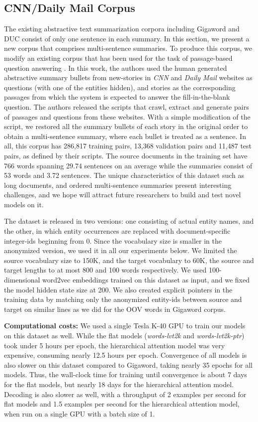 \subsection{CNN/Daily Mail Corpus} The existing abstractive text summarization corpora including Gigaword and DUC consist of only one sentence in each summary. In this section, we present a new corpus that comprises multi-sentence summaries. To produce this corpus, we modify an existing corpus that has been used for the task of passage-based question answering \cite{reading_comprehension}. In this work, the authors used the human generated abstractive summary bullets from new-stories in {\it CNN} and {\it Daily Mail} websites as questions (with one of the entities hidden), and stories as the corresponding passages from which the system is expected to answer the fill-in-the-blank question. The authors released the scripts that crawl,  extract and generate pairs of passages and questions from these websites. With a simple modification of the script, we restored all the summary bullets of each story in the original order to obtain a multi-sentence summary, where each bullet is treated as a sentence. In all, this corpus has 286,817 training pairs, 13,368 validation pairs and 11,487 test pairs, as defined by their scripts. The source documents in the training set have 766 words spanning 29.74 sentences on an average while the summaries consist of 53 words and 3.72 sentences. The unique characteristics of this dataset such as long documents, and ordered multi-sentence summaries present interesting challenges, and we hope will attract future researchers to build and test novel models on it.

The dataset is released in two versions: one consisting of actual entity names, and the other, in which entity occurrences are replaced with document-specific integer-ids beginning from 0. Since the vocabulary size is smaller in the anonymized version, we used it in all our experiments below. We limited the source vocabulary size to 150K, and the target vocabulary to 60K, the source and target lengths to at most 800 and 100 words respectively. We used 100-dimensional word2vec embeddings trained on this dataset as input, and we fixed the model hidden state size at 200. We also created explicit pointers in the training data by matching only the anonymized entity-ids between source and target on similar lines as we did for the OOV words in Gigaword corpus. 

{\bf Computational costs:} We used a single Tesla K-40 GPU to train our models on this dataset as well. While the flat models ({\it words-lvt2k} and {\it words-lvt2k-ptr}) took under 5 hours per epoch, the hierarchical attention model was very expensive, consuming nearly 12.5 hours per epoch. Convergence of all models is also slower on this dataset compared to Gigaword, taking nearly 35 epochs for all models. Thus, the wall-clock time for training until convergence is about 7 days for the flat models, but nearly 18 days for the hierarchical attention model. Decoding is also slower as well, with a throughput of 2 examples per second for flat models and 1.5 examples per second for the hierarchical attention model, when run on a single GPU with a batch size of 1.

